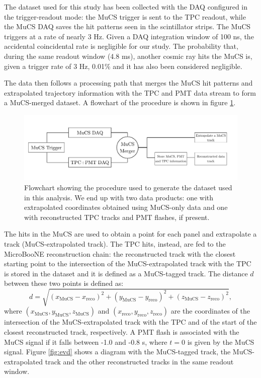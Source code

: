 \documentclass[a4paper]{scrartcl}
\begin{document}
The dataset used for this study has been collected with the DAQ configured in the trigger-readout mode: the MuCS trigger is sent to the TPC readout, while the MuCS DAQ saves the hit patterns seen in the scintillator strips.
The MuCS triggers at a rate of nearly 3 Hz.
Given a DAQ integration window of 100 ns, the accidental coincidental rate is negligible for our study. The probability that, during the same readout window (4.8 ms), another cosmic ray hits the MuCS is, given a trigger rate of 3 Hz, 0.01\% and it has also been considered negligible.

The data then follows a processing path that merges the MuCS hit patterns and extrapolated trajectory information with the TPC and PMT data stream to form a MuCS-merged dataset. A flowchart of the procedure is shown in figure \ref{fig:scheme}.

\begin{figure}[htbp]
  \includegraphics[width=\linewidth]{figures/scheme.pdf}
  \caption{Flowchart showing the procedure used to generate the dataset used in this analysis. We end up with two data products: one with extrapolated coordinates obtained using MuCS-only data and one with reconstructed TPC tracks and PMT flashes, if present.} \label{fig:scheme}
\end{figure}

The hits in the MuCS are used to obtain a point for each panel and extrapolate a track (MuCS-extrapolated track). The TPC hits, instead, are fed to the MicroBooNE reconstruction chain: the reconstructed track with the closest starting point to the intersection of the MuCS-extrapolated track with the TPC is stored in the dataset and it is defined as a MuCS-tagged track. The distance $d$ between these two points is defined as:
\begin{equation}\label{eq:d}
d = \sqrt{(x_{\mathrm{MuCS}}-x_{\mathrm{reco}})^2+(y_{\mathrm{MuCS}}-y_{\mathrm{reco}})^2+(z_{\mathrm{MuCS}}-z_{\mathrm{reco}})^2},
\end{equation}
where $(x_{\mathrm{MuCS}},y_{\mathrm{MuCS}},z_{\mathrm{MuCS}})$ and $(x_{\mathrm{reco}},y_{\mathrm{reco}},z_{\mathrm{reco}})$ are the coordinates of the intersection of the MuCS-extrapolated track with the TPC and of the start of the closest reconstructed track, respectively.
A PMT flash is associated with the MuCS signal if it falls between -1.0 and -0.8 \textmu s, where $t=0$ is given by the MuCS signal.
Figure \ref{fig:evd} shows a diagram with the MuCS-tagged track, the MuCS-extrapolated track and the other reconstructed tracks in the same readout window.
\end{document}
